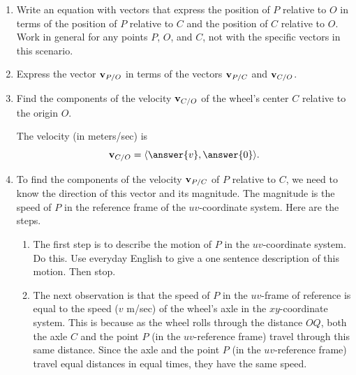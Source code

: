 \documentclass{ximera}
\begin{document}
\begin{question}




\begin{enumerate}
\item Write an equation with vectors that express the position of $P$ relative to $O$ in terms of the position of $P$ relative to $C$ and the position of $C$ relative to $O$. Work in general for any points $P$, $O$, and $C$, not with the specific vectors in this scenario.

\item Express the vector ${\bf v}_{P/O}$ in terms of the vectors ${\bf v}_{P/C}$ and ${\bf v}_{C/O}$. 

\item Find the components of the velocity ${\bf v}_{C/O}$ of the wheel's center $C$ relative to the origin $O$.

The velocity (in meters/sec) is 
\[
  {\bf v}_{C/O} = \langle \answer{v}, \answer{0} \rangle.
\]

\item To find the components of the velocity ${\bf v}_{P/C}$ of $P$ relative to $C$, we need to know the direction of this vector and its magnitude. The magnitude is the speed of $P$ in the reference frame of the $uv$-coordinate system. Here are the steps.

\begin{enumerate}

\item The first step is to describe the motion of $P$ in the $uv$-coordinate system. Do this. Use everyday English to give a one sentence description of this motion. Then stop.

\begin{freeResponse}
\end{freeResponse}

\item The next observation is that the speed of $P$ in the $uv$-frame of reference is equal to the speed ($v$ m/sec) of the wheel's axle in the $xy$-coordinate system. This is because as the wheel rolls through the distance ${OQ}$, both the axle $C$ and the point $P$ (in the $uv$-reference frame) travel through this same distance. Since the axle and the point $P$ (in the $uv$-reference frame) travel equal distances in equal times, they have the same speed.


\end{enumerate}
\end{enumerate}
\end{question}
\end{document}
